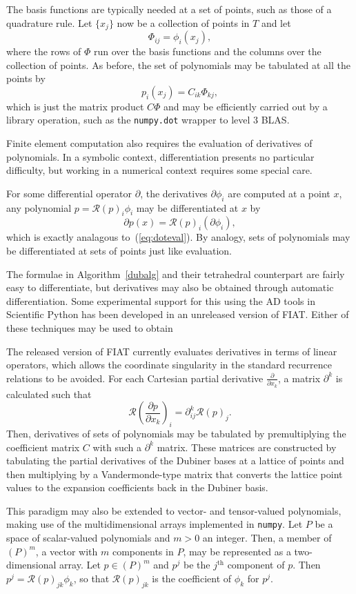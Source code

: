 The basis functions are typically needed at a set of points, such as
those of a quadrature rule.  Let \( \{
x_j \} \) now be a collection of points in \( T \) and let
\[
\Phi_{ij} = \phi_i(x_j),
\]
where the rows of \( \Phi \) run over the basis functions and the
columns over the collection of points.  As before, the set of
polynomials may be tabulated at all the points by
\[
p_i(x_j) = C_{ik} \Phi_{kj},
\]
which is just the matrix product \( C \Phi \) and may
be efficiently carried out by a library operation,
such as the \texttt{numpy.dot} wrapper to level 3 BLAS.

Finite element computation also requires the evaluation of derivatives
of polynomials.  In a symbolic context, differentiation presents no
particular difficulty, but working in a numerical context requires
some special care.

For some differential operator \( \partial \), the derivatives
\( \partial \phi_i \) are computed at a point \( x \), any polynomial
\( p = \mathcal{R}(p)_i \phi_i \) may be differentiated at \( x \) by
\[
\partial p(x) = \mathcal{R}(p)_i (\partial \phi_i),
\]
which is exactly analagous to~(\ref{eq:doteval}).  By analogy, sets of
polynomials may be differentiated at sets of points just like
evaluation.

The formulae in Algorithm~\ref{dubalg} and their tetrahedral counterpart are
fairly easy to differentiate, but derivatives may also be obtained through
automatic differentiation.  Some experimental support for this using
the AD tools in Scientific Python has been developed in an unreleased
version of FIAT.  Either of these techniques may be used to obtain 

The released version of FIAT currently evaluates derivatives in terms
of linear operators, which allows the coordinate singularity in the
standard recurrence relations to be avoided.  For each Cartesian
partial derivative \( \frac{\partial}{\partial x_k} \), a matrix \(
\partial^k \) is calculated such that
\[
\mathcal{R}\left(\frac{\partial p}{\partial x_k}\right)_i
= \partial^k_{ij} \mathcal{R}(p)_j.
\]
Then, derivatives of sets of polynomials may be tabulated by
premultiplying the coefficient matrix \( C \) with such
a \( \partial^k \) matrix.  These matrices are constructed by
tabulating the partial derivatives of the Dubiner bases at a lattice
of points and then multiplying by a Vandermonde-type matrix that
converts the lattice point values to the expansion coefficients back
in the Dubiner basis.

This paradigm may also be extended to vector- and tensor-valued
polynomials, making use of the multidimensional arrays implemented in
\texttt{numpy}.  Let \( P \) be a space of scalar-valued polynomials and
\( m > 0 \) an integer.  Then, a member of \( (P)^m \), a vector with
\( m \) components in \( P \), may be represented as a two-dimensional
array.  Let \( p \in (P)^m \) and \( p^j \) be the \( j^\mathrm{th} \)
component of \( p \).  Then \( p^j = \mathcal{R}(p)_{jk} \phi_k \), so
that \( \mathcal{R}(p)_{jk} \) is the coefficient of \( \phi_k \) for
\( p^j \).

